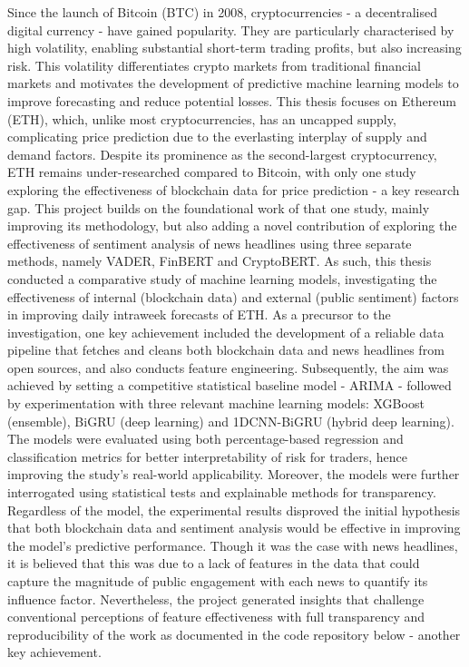 \documentclass[ %
                    author={Raj Dhakan},
                supervisor={Dr. Ayush Joshi},
                    degree={MSc},
                     title={Ethereum Price Prediction using Internal and External Factors},
                  subtitle={},
                      type={},
                      year={2025}]{dissertation}
\begin{document}
\noindent Since the launch of Bitcoin (BTC) in 2008, cryptocurrencies - a decentralised digital currency - have gained popularity. They are particularly characterised by high volatility, enabling substantial short-term trading profits, but also increasing risk. This volatility differentiates crypto markets from traditional financial markets and motivates the development of predictive machine learning models to improve forecasting and reduce potential losses. This thesis focuses on Ethereum (ETH), which, unlike most cryptocurrencies, has an uncapped supply, complicating price prediction due to the everlasting interplay of supply and demand factors. Despite its prominence as the second-largest cryptocurrency, ETH remains under-researched compared to Bitcoin, with only one study exploring the effectiveness of blockchain data for price prediction - a key research gap. This project builds on the foundational work of that one study, mainly improving its methodology, but also adding a novel contribution of exploring the effectiveness of sentiment analysis of news headlines using three separate methods, namely VADER, FinBERT and CryptoBERT. As such, this thesis conducted a comparative study of machine learning models, investigating the effectiveness of internal (blockchain data) and external (public sentiment) factors in improving daily intraweek forecasts of ETH. As a precursor to the investigation, one key achievement included the development of a reliable data pipeline that fetches and cleans both blockchain data and news headlines from open sources, and also conducts feature engineering. Subsequently, the aim was achieved by setting a competitive statistical baseline model - ARIMA - followed by experimentation with three relevant machine learning models: XGBoost (ensemble), BiGRU (deep learning) and 1DCNN-BiGRU (hybrid deep learning). The models were evaluated using both percentage-based regression and classification metrics for better interpretability of risk for traders, hence improving the study’s real-world applicability. Moreover, the models were further interrogated using statistical tests and explainable methods for transparency. Regardless of the model, the experimental results disproved the initial hypothesis that both blockchain data and sentiment analysis would be effective in improving the model’s predictive performance. Though it was the case with news headlines, it is believed that this was due to a lack of features in the data that could capture the magnitude of public engagement with each news to quantify its influence factor. Nevertheless, the project generated insights that challenge conventional perceptions of feature effectiveness with full transparency and reproducibility of the work as documented in the code repository below - another key achievement. 
\end{document}
